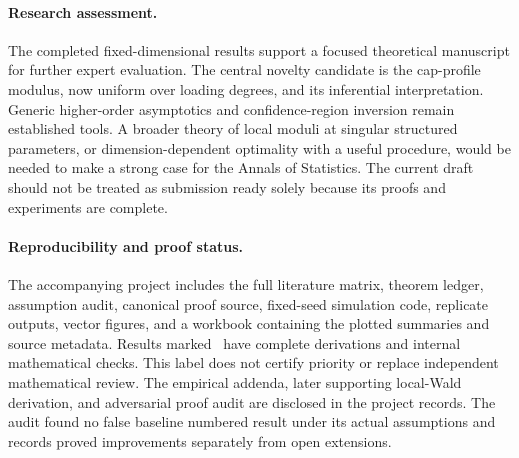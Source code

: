 \paragraph{Research assessment.}
The completed fixed-dimensional results support a focused theoretical manuscript for further expert evaluation. The central novelty candidate is the cap-profile modulus, now uniform over loading degrees, and its inferential interpretation. Generic higher-order asymptotics and confidence-region inversion remain established tools. A broader theory of local moduli at singular structured parameters, or dimension-dependent optimality with a useful procedure, would be needed to make a strong case for the Annals of Statistics. The current draft should not be treated as submission ready solely because its proofs and experiments are complete.

\paragraph{Reproducibility and proof status.}
The accompanying project includes the full literature matrix, theorem ledger, assumption audit, canonical proof source, fixed-seed simulation code, replicate outputs, vector figures, and a workbook containing the plotted summaries and source metadata. Results marked \pr\ have complete derivations and internal mathematical checks. This label does not certify priority or replace independent mathematical review. The empirical addenda, later supporting local-Wald derivation, and adversarial proof audit are disclosed in the project records. The audit found no false baseline numbered result under its actual assumptions and records proved improvements separately from open extensions.

